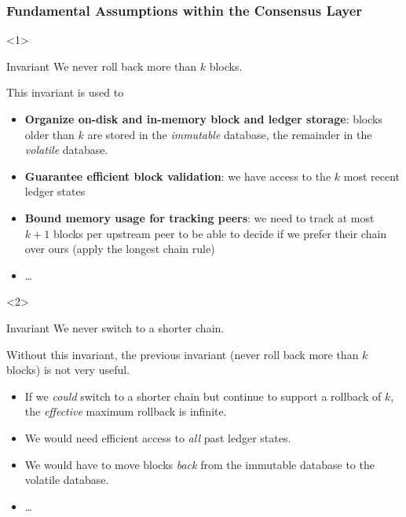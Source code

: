 \documentclass[t]{beamer}
\begin{document}
\begin{frame}
\frametitle{Fundamental Assumptions within the Consensus Layer}


\begin{onlyenv}<1>

\begin{alertblock}{Invariant}
We never roll back more than $k$ blocks.
\end{alertblock}

This invariant is used to

\begin{itemize}
\item \textbf{Organize on-disk and in-memory block and ledger storage}: blocks older
than $k$ are stored in the \emph{immutable} database, the remainder in the
\emph{volatile} database.
\item \textbf{Guarantee efficient block validation}: we have access to the $k$
most recent ledger states
\item \textbf{Bound memory usage for tracking peers}: we need to track at most $k + 1$
blocks per upstream peer to be able to decide if we prefer their chain over
ours (apply the longest chain rule)
\item \dots
\end{itemize}

\end{onlyenv}


\begin{onlyenv}<2>
\begin{alertblock}{Invariant}
We never switch to a shorter chain.
\end{alertblock}

\pause

Without this invariant, the previous invariant (never roll back
more than $k$ blocks) is not very useful.

\begin{itemize}
\item If we \emph{could} switch to a shorter chain but continue to support a
rollback of $k$, the \emph{effective} maximum rollback is infinite.
\item We would need efficient access to \emph{all} past ledger states.
\item We would have to move blocks \emph{back} from the immutable database to the volatile database.
\item \dots
\end{itemize}
\end{onlyenv}


\end{frame}
\end{document}
